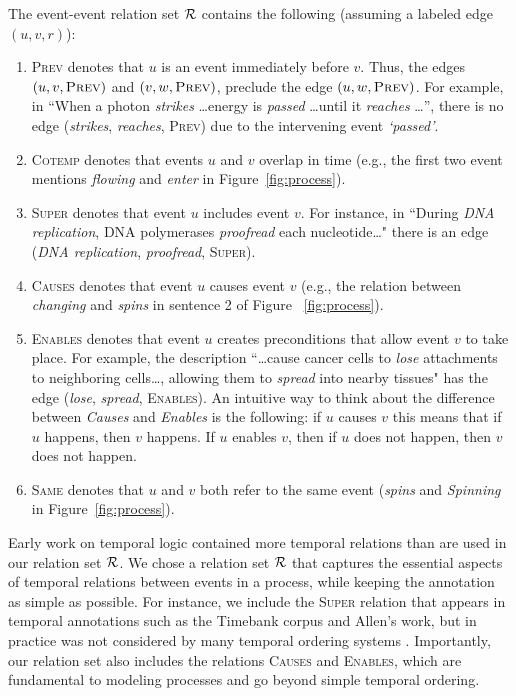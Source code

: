 The event-event relation set $\mathcal{R}$ contains the following (assuming a labeled edge $(u,v,r)$):
\begin{enumerate}[itemsep=0pt] 
\item \textsc{Prev} denotes that $u$ is an event immediately before $v$. Thus, the edges $(u,v,\mbox{\textsc{Prev}})$ and $(v,w,\mbox{\textsc{Prev}})$, preclude the edge $(u,w,\mbox{\textsc{Prev}})$. For example, in ``When a photon \emph{strikes} \ldots energy is  \emph{passed} \ldots until it \emph{reaches} \ldots'', there is no edge (\emph{strikes}, \emph{reaches}, \textsc{Prev}) due to the intervening event \emph{`passed'}.
\item \textsc{Cotemp} denotes that events $u$ and $v$ overlap in time (e.g., the first two event mentions \emph{flowing} and \emph{enter} in Figure~\ref{fig:process}).
\item \textsc{Super} denotes that event $u$ includes event $v$. For instance, in ``During \emph{DNA replication}, DNA polymerases \emph{proofread} each nucleotide\ldots" there is an edge (\emph{DNA replication}, \emph{proofread}, \textsc{Super}).
\item \textsc{Causes} denotes that event $u$ causes event $v$ (e.g., the relation between \emph{changing} and \emph{spins} in sentence 2 of Figure ~\ref{fig:process}). 
\item \textsc{Enables} denotes that event $u$ creates preconditions that allow event $v$ to take place. For example, the description ``\ldots cause cancer cells  to \emph{lose} attachments to neighboring cells\ldots, allowing them to \emph{spread} into nearby tissues" has the edge (\emph{lose}, \emph{spread}, \textsc{Enables}). An intuitive way to think about the difference between \emph{Causes} and \emph{Enables} is the following: if $u$ causes $v$ this means that if $u$ happens, then $v$ happens. If $u$ enables $v$, then if $u$ does not happen, then $v$ does not happen.
\item \textsc{Same} denotes that $u$ and $v$  both refer to the same event (\emph{spins} and \emph{Spinning} in  Figure~\ref{fig:process}).
\end{enumerate}

Early work on temporal logic \cite{Allen83} contained more temporal relations than are used in our relation set $\mathcal{R}$. We chose a relation set $\mathcal{R}$ that captures the essential aspects of temporal relations between events in a process, while keeping the annotation as simple as possible. For instance, we include the \textsc{Super} relation that appears in temporal annotations such as the Timebank corpus \cite{Pustejovsky03} and Allen's work, but in practice was not considered by many temporal ordering systems \cite{Chambers08,Yoshikawa09,Do12}. Importantly, our relation set also includes the relations \textsc{Causes} and \textsc{Enables}, which are fundamental to modeling processes and go beyond simple temporal ordering. 

